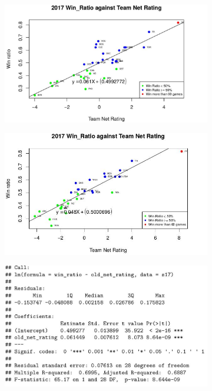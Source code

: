 \documentclass[11pt]{article}
\begin{document}
\begin{figure}[h!]
  \centering
  \begin{subfigure}[b]{0.45\linewidth}
    \includegraphics[width=\linewidth]{nr_17.jpg}
  \end{subfigure}
  \begin{subfigure}[b]{0.45\linewidth}
    \includegraphics[width=\linewidth]{new_nr_17.jpg}
  \end{subfigure}
  \begin{subfigure}[b]{0.42\linewidth}
    \includegraphics[width=\linewidth]{nr_17_summary.jpg}

\end{subfigure}
\end{figure}
\end{document}
